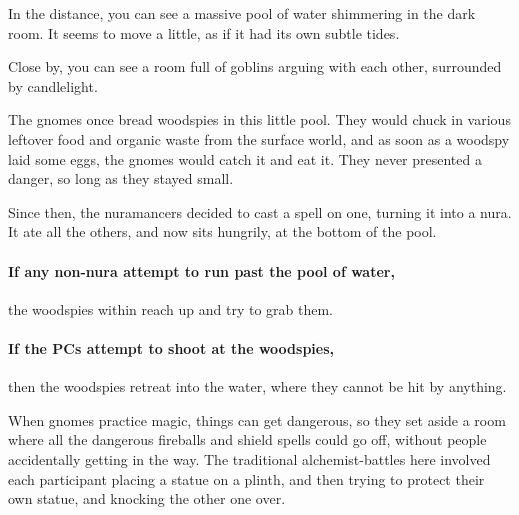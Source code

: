\begin{multicols}{2}
\begin{boxtext}

	In the distance, you can see a massive pool of water shimmering in the dark room.
	It seems to move a little, as if it had its own subtle tides.

	Close by, you can see a room full of goblins arguing with each other, surrounded by candlelight.

\end{boxtext}

\begin{exampletext}

	The gnomes once bread woodspies in this little pool.
	They would chuck in various leftover food and organic waste from the surface world, and as soon as a woodspy laid some eggs, the gnomes would catch it and eat it.
	They never presented a danger, so long as they stayed small.

	Since then, the nuramancers decided to cast a spell on one, turning it into a nura.
	It ate all the others, and now sits hungrily, at the bottom of the pool.

\end{exampletext}


\paragraph{If any non-nura attempt to run past the pool of water,}
the woodspies within reach up and try to grab them.

\paragraph{If the PCs attempt to shoot at the woodspies,}
then the woodspies retreat into the water, where they cannot be hit by anything.


\begin{exampletext}

	When gnomes practice magic, things can get dangerous, so they set aside a room where all the dangerous fireballs and shield spells could go off, without people accidentally getting in the way.
	The traditional alchemist-battles here involved each participant placing a statue on a plinth, and then trying to protect their own statue, and knocking the other one over.

\end{exampletext}


\end{multicols}
